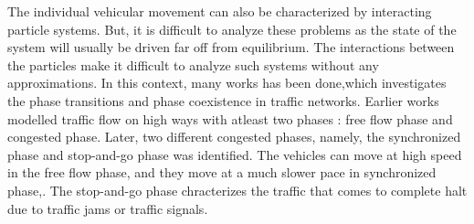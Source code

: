 \documentclass[a4paper,12pt]{scrartcl}
\begin{document}
The individual vehicular movement can also be characterized by interacting particle systems. But, it is difficult to analyze these problems as the state of the system will usually be driven far off from equilibrium. The interactions between the particles make it difficult to analyze such systems without any approximations. In this context, many works has been done,which investigates the phase transitions and phase coexistence in traffic networks\cite{dal2017MMAS}. Earlier works modelled traffic flow on high ways with atleast two phases : free flow phase and congested phase. Later, two different congested phases, namely, the synchronized phase and stop-and-go phase was identified. The vehicles can move at high speed in the free flow phase, and they move at a much slower pace in synchronized phase,. The stop-and-go phase chracterizes the traffic that comes to complete halt due to traffic jams or traffic signals. 



\newpage




    
\end{document}

